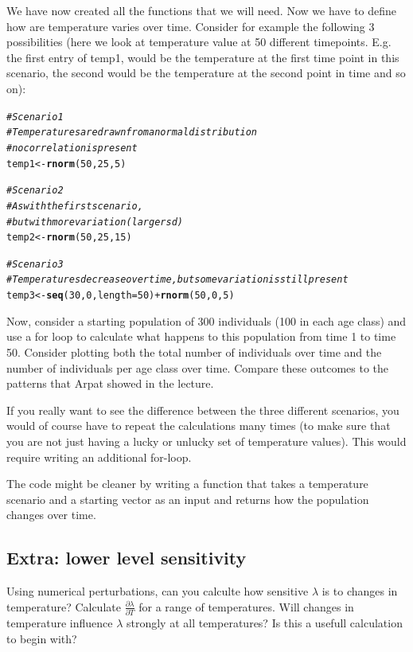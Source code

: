 \documentclass{article}\usepackage[]{graphicx}\usepackage[]{color}
\makeatletter
\newcommand{\hlnum}[1]{\textcolor[rgb]{0.686,0.059,0.569}{#1}}%
\newcommand{\hlcom}[1]{\textcolor[rgb]{0.678,0.584,0.686}{\textit{#1}}}%
\newcommand{\hlopt}[1]{\textcolor[rgb]{0,0,0}{#1}}%
\newcommand{\hlstd}[1]{\textcolor[rgb]{0.345,0.345,0.345}{#1}}%
\newcommand{\hlkwb}[1]{\textcolor[rgb]{0.69,0.353,0.396}{#1}}%
\newcommand{\hlkwc}[1]{\textcolor[rgb]{0.333,0.667,0.333}{#1}}%
\newcommand{\hlkwd}[1]{\textcolor[rgb]{0.737,0.353,0.396}{\textbf{#1}}}%
\newenvironment{kframe}{%
 \def\at@end@of@kframe{}%
 \ifinner\ifhmode%
  \def\at@end@of@kframe{\end{minipage}}%
  \begin{minipage}{\columnwidth}%
 \fi\fi%
 \def\FrameCommand##1{\hskip\@totalleftmargin \hskip-\fboxsep
 \colorbox{shadecolor}{##1}\hskip-\fboxsep
     \hskip-\linewidth \hskip-\@totalleftmargin \hskip\columnwidth}%
 \MakeFramed {\advance\hsize-\width
   \@totalleftmargin\z@ \linewidth\hsize
   \@setminipage}}%
 {\par\unskip\endMakeFramed%
 \at@end@of@kframe}
\newenvironment{knitrout}{}{} %
\makeatother
\begin{document}
We have now created all the functions that we will need. Now we have to define how are temperature varies over time. Consider for example the following 3 possibilities (here we look at temperature value at 50 different timepoints. E.g. the first entry of temp1, would be the temperature at the first time point in this scenario, the second would be the temperature at the second point in time and so on):
\begin{knitrout}
\color{fgcolor}\begin{kframe}
\begin{alltt}
\hlcom{# Scenario 1}
\hlcom{# Temperatures are drawn from a normal distribution}
\hlcom{# no correlation is present}
\hlstd{temp1} \hlkwb{<-} \hlkwd{rnorm}\hlstd{(}\hlnum{50}\hlstd{,}\hlnum{25}\hlstd{,}\hlnum{5}\hlstd{)}

\hlcom{# Scenario 2}
\hlcom{# As with the first scenario,}
\hlcom{# but with more variation (larger sd)}
\hlstd{temp2} \hlkwb{<-} \hlkwd{rnorm}\hlstd{(}\hlnum{50}\hlstd{,}\hlnum{25}\hlstd{,}\hlnum{15}\hlstd{)}

\hlcom{# Scenario 3}
\hlcom{# Temperatures decrease over time, but some variation is still present}
\hlstd{temp3} \hlkwb{<-} \hlkwd{seq}\hlstd{(}\hlnum{30}\hlstd{,}\hlnum{0}\hlstd{,}\hlkwc{length}\hlstd{=}\hlnum{50}\hlstd{)}\hlopt{+}\hlkwd{rnorm}\hlstd{(}\hlnum{50}\hlstd{,}\hlnum{0}\hlstd{,}\hlnum{5}\hlstd{)}
\end{alltt}
\end{kframe}
\end{knitrout}
Now, consider a starting population of 300 individuals (100 in each age class) and use a for loop to calculate what happens to this population from time 1 to time 50. Consider plotting both the total number of individuals over time and the number of individuals per age class over time. Compare these outcomes to the patterns that Arpat showed in the lecture.

If you really want to see the difference between the three different scenarios, you would of course have to repeat the calculations many times (to make sure that you are not just having a lucky or unlucky set of temperature values). This would require writing an additional for-loop. 

The code might be cleaner by writing a function that takes a temperature scenario and a starting vector as an input and returns how the population changes over time. 

\subsection{Extra: lower level sensitivity}
Using numerical perturbations, can you calculte how sensitive $\lambda$ is to changes in temperature? Calculate $\frac{\partial \lambda}{\partial T}$ for a range of temperatures. Will changes in temperature influence $\lambda$ strongly at all temperatures? Is this a usefull calculation to begin with?
\end{document}
